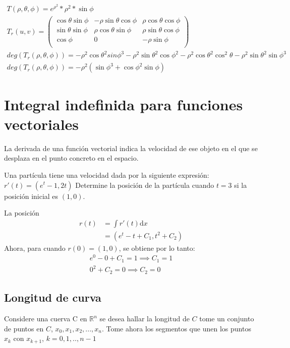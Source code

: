 \documentclass{article}
\newcommand{\field}[1]{\mathbb{#1}}
\newcommand{\R}{\field{R}}
\begin{document}
\begin{align}
  T(\rho, \theta, \phi) = e^{\rho^2} * \rho^2 * \sin{\phi} \\
  T_r(u, v) = \left( \begin{matrix}
    \cos\theta{}\sin{\phi} & -\rho\sin{ \theta}\cos{\phi} & \rho\cos{\theta}\cos{\phi} \\
    \sin{\theta}\sin{\phi} & \rho\cos{\theta}\sin{\phi} & \rho\sin{\theta}\cos{\phi} \\
    \cos{\phi} & 0 & -\rho\sin{\phi} \\
  \end{matrix} \right) \\
  deg(T_r(\rho, \theta, \phi)) = -\rho^2\cos{\theta}^2sin{\phi}^3 - \rho^2\sin{\theta}^2\cos{\phi}^2 - \rho^2\cos{\theta}^2\cos^2{\theta} - \rho^2\sin{\theta}^2\sin{\phi}^3 \\
  deg(T_r(\rho, \theta, \phi)) = -\rho^2(\sin{\phi}^3+\cos{\phi}^2\sin{\phi})
\end{align}

\section*{Integral indefinida para funciones vectoriales}

La derivada de una función vectorial indica la velocidad de ese objeto en el que
se desplaza en el punto concreto en el espacio.

Una partícula tiene una velocidad dada por la siguiente expresión:
$ r'(t) = (e^t-1, 2t) $ Determine la posición de la partícula cuando $ t = 3 $
si la posición inicial es $ (1, 0) $.

La posición 
\begin{align}
  r(t) &= \int r'(t) \mathrm{d}x \\
  &= (e^t-t+C_1, t^2+C_2)
\end{align}
Ahora, para cuando $ r(0) = (1, 0) $, se obtiene por lo tanto:
\begin{align}
  e^0 - 0 + C_1 = 1 \implies C_1 = 1 \\
  0^2 + C_2 = 0 \implies C_2 = 0
\end{align}

\subsection*{Longitud de curva}

Considere una cuerva C en $ \R^n $ se desea hallar la longitud de $ C $ tome un
conjunto de puntos en $ C $, $x_0, x_1, x_2, ..., x_n$. Tome ahora los segmentos
que unen los puntos $ x_k $ con $ x_{k + 1} $, $ k = 0, 1, .., n - 1 $
\end{document}
